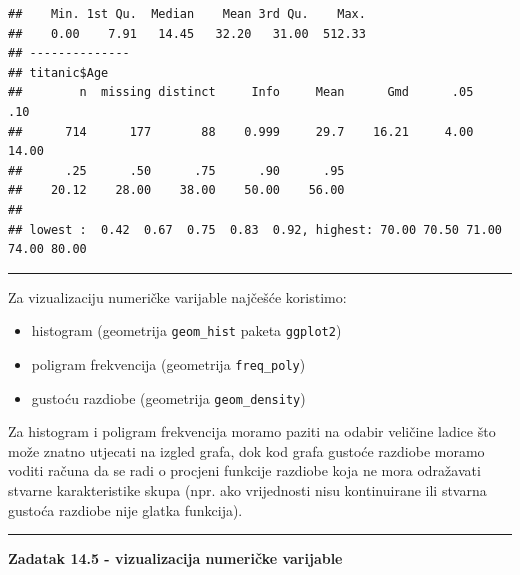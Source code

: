 \documentclass[]{book}
\newenvironment{Shaded}{\begin{snugshade}}{\end{snugshade}}
\newcommand{\KeywordTok}[1]{\textcolor[rgb]{0.13,0.29,0.53}{\textbf{#1}}}
\newcommand{\CharTok}[1]{\textcolor[rgb]{0.31,0.60,0.02}{#1}}
\newcommand{\StringTok}[1]{\textcolor[rgb]{0.31,0.60,0.02}{#1}}
\newcommand{\CommentTok}[1]{\textcolor[rgb]{0.56,0.35,0.01}{\textit{#1}}}
\newcommand{\OperatorTok}[1]{\textcolor[rgb]{0.81,0.36,0.00}{\textbf{#1}}}
\newcommand{\NormalTok}[1]{#1}
\providecommand{\tightlist}{%
  \setlength{\itemsep}{0pt}\setlength{\parskip}{0pt}}
\theoremstyle{definition}
\theoremstyle{definition}
\theoremstyle{definition}
\theoremstyle{remark}
\begin{document}
\begin{Shaded}
\end{Shaded}

\begin{verbatim}
##    Min. 1st Qu.  Median    Mean 3rd Qu.    Max. 
##    0.00    7.91   14.45   32.20   31.00  512.33 
## --------------
## titanic$Age 
##        n  missing distinct     Info     Mean      Gmd      .05      .10 
##      714      177       88    0.999     29.7    16.21     4.00    14.00 
##      .25      .50      .75      .90      .95 
##    20.12    28.00    38.00    50.00    56.00 
## 
## lowest :  0.42  0.67  0.75  0.83  0.92, highest: 70.00 70.50 71.00 74.00 80.00
\end{verbatim}

\begin{center}\rule{0.5\linewidth}{\linethickness}\end{center}

Za vizualizaciju numeričke varijable najčešće koristimo:

\begin{itemize}
\tightlist
\item
  histogram (geometrija \texttt{geom\_hist} paketa \texttt{ggplot2})
\item
  poligram frekvencija (geometrija \texttt{freq\_poly})
\item
  gustoću razdiobe (geometrija \texttt{geom\_density})
\end{itemize}

Za histogram i poligram frekvencija moramo paziti na odabir veličine
ladice što može znatno utjecati na izgled grafa, dok kod grafa gustoće
razdiobe moramo voditi računa da se radi o procjeni funkcije razdiobe
koja ne mora odražavati stvarne karakteristike skupa (npr. ako
vrijednosti nisu kontinuirane ili stvarna gustoća razdiobe nije glatka
funkcija).

\begin{center}\rule{0.5\linewidth}{\linethickness}\end{center}

\textbf{Zadatak 14.5 - vizualizacija numeričke varijable}
\end{document}
